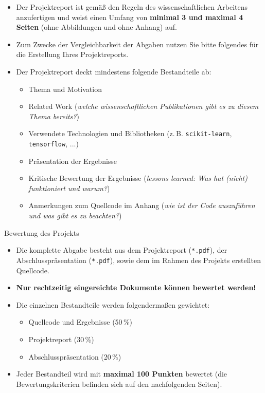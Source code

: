 \begin{frame}
	\begin{itemize}
		\item Der Projektreport ist gemäß den Regeln des wissenschaftlichen Arbeitens anzufertigen und weist einen Umfang von
			\textbf{minimal 3 und maximal 4 Seiten} (ohne Abbildungen und ohne Anhang) auf.
		\item Zum Zwecke der Vergleichbarkeit der Abgaben nutzen Sie bitte folgendes \template{} für die Erstellung Ihres Projektreports.
		\item Der Projektreport deckt mindestens folgende Bestandteile ab:
		\begin{itemize}
			\item Thema und Motivation
			\item Related Work (\textit{welche wissenschaftlichen Publikationen gibt es zu diesem Thema bereits?})
			\item Verwendete Technologien und Bibliotheken (z.\,B. \texttt{scikit-learn}, \texttt{tensorflow}, ...)
			\item Präsentation der Ergebnisse
			\item Kritische Bewertung der Ergebnisse (\textit{\glqq{}lessons learned\grqq{}: Was hat (nicht) funktioniert und warum?})
			\item Anmerkungen zum Quellcode im Anhang (\textit{wie ist der Code auszuführen und was gibt es zu beachten?})
		\end{itemize}
	\end{itemize}
\end{frame}


\begin{dwHeaderFrame}{Bewertung des Projekts}
	\begin{itemize}
		\item Die komplette Abgabe besteht aus dem Projektreport (\texttt{*.pdf}), der Abschlusspräsentation (\texttt{*.pdf}),
			sowie dem im Rahmen des Projekts erstellten Quellcode.
		\item \textbf{Nur rechtzeitig eingereichte Dokumente können bewertet werden!}
		\item Die einzelnen Bestandteile werden folgendermaßen gewichtet:
		\begin{itemize}
			\item Quellcode und Ergebnisse (50\,\%)
			\item Projektreport (30\,\%)
			\item Abschlusspräsentation (20\,\%)
		\end{itemize}
		\item Jeder Bestandteil wird mit \textbf{maximal 100 Punkten} bewertet (die Bewertungskriterien befinden sich auf den nachfolgenden Seiten).
	\end{itemize}

\end{dwHeaderFrame}


